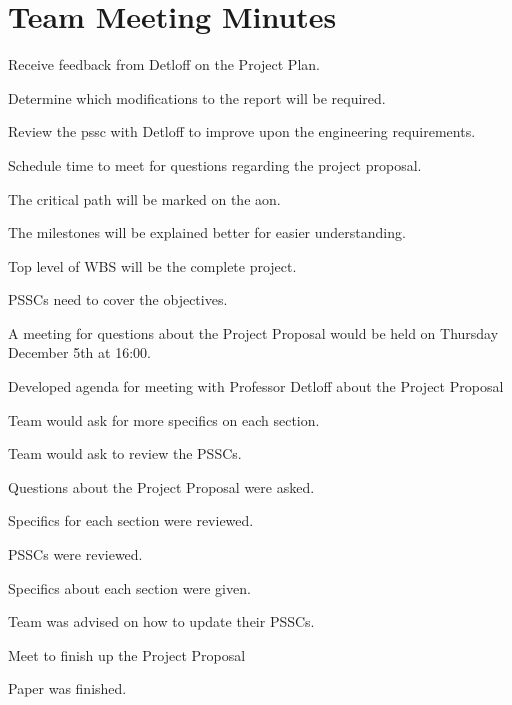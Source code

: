 \chapter{Team Meeting Minutes}
\minutesdetails
{
	\item Receive feedback from Detloff on the Project Plan.
	\item Determine which modifications to the report will be required.
	\item Review the \gls{pssc} with Detloff to improve upon the engineering requirements.
	\item Schedule time to meet for questions regarding the project proposal.}
{
	\item The critical path will be marked on the \gls{aon}.
	\item The milestones will be explained better for easier understanding. 
	\item Top level of WBS will be the complete project.
	\item PSSCs need to cover the objectives.
	\item A meeting for questions about the Project Proposal would be held on Thursday December 5th at 16:00.
}

\minutesdetails
{
	\item Developed agenda for meeting with Professor Detloff about the Project Proposal}
{
	\item Team would ask for more specifics on each section.
	\item Team would ask to review the PSSCs.
}

\minutesdetails
{
	\item Questions about the Project Proposal were asked. 
	\item Specifics for each section were reviewed.
	\item PSSCs were reviewed.}
{
	\item Specifics about each section were given.
	\item Team was advised on how to update their PSSCs.
}

\minutesdetails
{
	\item Meet to finish up the Project Proposal}
{
	\item Paper was finished.
}

\signatures